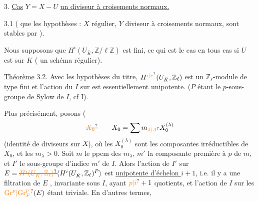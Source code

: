 3. \uline{Cas}   $Y=X-U$  \uline{un diviseur à croisements normaux.} 

3.1 
(   que les hypothèses : $X$ régulier, $Y$ diviseur à croisements normaux, sont stables par  ).

Nous supposons  que $H^i(U_{\bar K},\mathbb Z/\ell\mathbb Z)$ est fini, ce qui est le cas en tous cas si $U$ est  sur $K$ ( un schéma régulier).

\uline{Théorème} 3.2. Avec les hypothèses du titre,     $H^{\unsure{i|*}}(U_{\bar K},\mathbb Z_\ell)$ est un $\mathbb Z_\ell$-module de type fini et l'action du  $I$ sur  est essentiellement unipotente.  ($P$ étant le $p$-sous-groupe de Sylow de $I$, cf I\unsure{\ldots}).

Plus précisément,  posons (
\[
\deleted{\unsure{X_0}}\qquad X_0=\sum m_{\unsure{\lambda|A}}X_0^{(\lambda)}
\]
(identité de diviseurs sur $X$),  où les $X_0^{(\lambda)}$ sont les composantes irréductibles de $X_0$, et les $m_\lambda>0$. Soit $m$ le ppcm des $m_\lambda$,  $m'$ la composante première à $p$ de $m$, et $I'$ le sous-groupe  d'indice $m'$ de $I$. Alors l'action de $I'$ sur $E=\deleted{\unsure{H^i(U_{\bar K},\mathbb Z_\ell)}}\inserted{H^i(U_{\bar K},\mathbb Z_\ell)^P}$ est \uline{unipotente d'échelon $i+1$}, i.e. il y a une filtration  de $E$ , invariante sous $I$, ayant $\unsure{p|i}+1$ quotients, et l'action de $I$ sur les $\unsure{\mathrm{Gr}^p|\mathrm{Gr}_F^p}(E)$ étant triviale. En d'autres termes,

